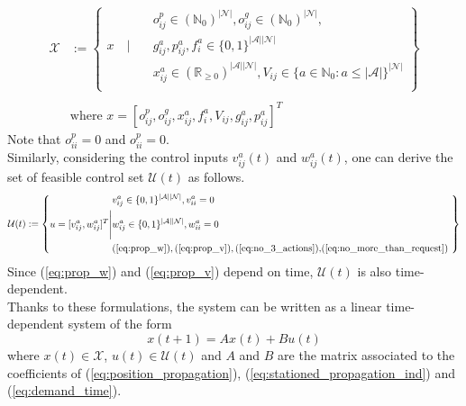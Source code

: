 \begin{equation}
	\begin{aligned}
	\mathcal{X} &:= \left\{
	\begin{aligned}
		&  o^p_{ij} \in (\mathbb{N}_0)^{|\mathcal{N}|}, o^g_{ij} \in (\mathbb{N}_0)^{|\mathcal{N}|},  \\
		 x \quad  \Bigg| \quad&g^a_{ij}, p^a_{ij},f^a_{i} \in \{0,1\}^{|\mathcal{A}||\mathcal{N}|} \\%
		&  x_{ij}^a\in (\mathbb{R}_{\ge 0})^{|\mathcal{A}||\mathcal{N}|}, V_{ij} \in \{ a \in \mathbb{N}_0 : a \leq |\mathcal{A}| \}^{|\mathcal{N}|}\\%
	\end{aligned}
	\right\}\\
	&\\
	&\text{where }  x = [o^p_{ij},o^g_{ij}, x_{ij}^a, f^a_{i}, V_{ij} , g^a_{ij}, p^a_{ij}]^T
\end{aligned}
\end{equation}
Note that $o^p_{ii} = 0$ and $o^p_{ii} = 0$. \\
Similarly, considering the control inputs $v^{a}_{ij}(t)$ and $w^{a}_{ij}(t)$, one can derive the set of feasible control set $\mathcal{U}(t)$ as follows. 
\begin{equation}
	\mathcal{\mathcal{U}}(t) := \left\{
	\begin{aligned}
		&v^a_{ij} \in \{0,1\}^{|\mathcal{A}||\mathcal{N}|}, v^a_{ii} = 0 \\
		u = [v^{a}_{ij}, w^{a}_{ij}]^T \Bigg|&w^a_{ij} \in \{0,1\}^{|\mathcal{A}||\mathcal{N}|},w^a_{ii} = 0 \\ 
		&\text{(\ref{eq:prop_w})},\text{(\ref{eq:prop_v})}, \text{(\ref{eq:no_3_actions}),(\ref{eq:no_more_than_request})
		} \\
	\end{aligned}
	\right\}
\end{equation}
Since (\ref{eq:prop_w}) and (\ref{eq:prop_v}) depend on time, $\mathcal{U}(t)$ is also time-dependent. \\
Thanks to these formulations, the system can be written as a linear time-dependent system of the form
\begin{equation}
	x(t+1) = Ax(t) + Bu(t)\label{eq:normal_system}
\end{equation}
where $x(t) \in \mathcal{X}$, $u(t) \in \mathcal{U}(t)$ and $A$ and $B$ are the matrix associated to the coefficients of (\ref{eq:position_propagation}), (\ref{eq:stationed_propagation_ind}) and (\ref{eq:demand_time}). \\
